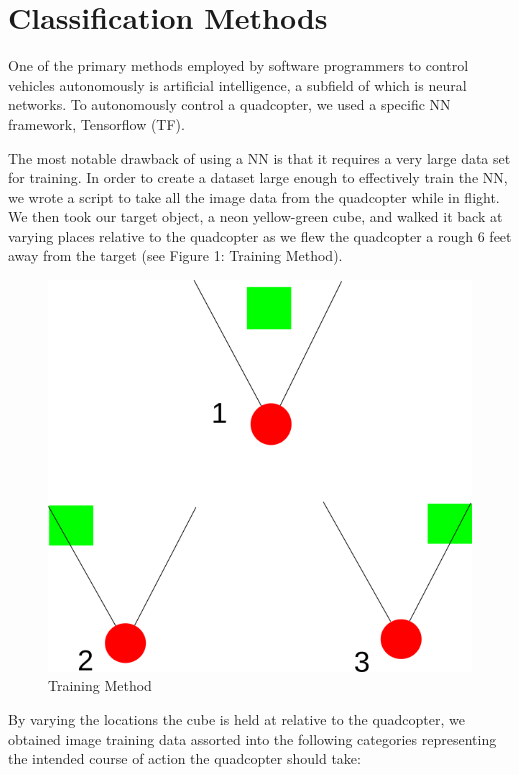 \documentclass[12pt]{article}
\begin{document}
\section{Classification Methods}
{

	\quad One of the primary methods employed by software programmers to control vehicles autonomously is artificial intelligence, a subfield of which is neural networks. To autonomously control a quadcopter, we used a specific NN framework, Tensorflow (TF). \newline

	\quad The most notable drawback of using a NN is that it requires a very large data set for training. In order to create a dataset large enough to effectively train the NN, we wrote a script to take all the image data from the quadcopter while in flight. We then took our target object, a neon yellow-green cube, and walked it back at varying places relative to the quadcopter as we flew the quadcopter a rough 6 feet away from the target (see Figure 1: Training Method). 	
	

	\begin{figure}[h]
	\centering
	\includegraphics[scale=0.3]{quad-image}
	\caption{Training Method}
	\end{figure}

	\quad By varying the locations the cube is held at relative to the quadcopter, we obtained image training data assorted into the following categories representing the intended course of action the quadcopter should take:

}
\end{document}
